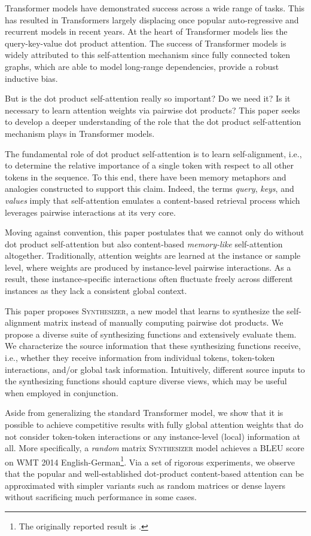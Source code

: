\documentclass{article}
\begin{document}
Transformer models \citep{vaswani2017attention} have demonstrated success across a wide range of tasks. This has resulted in Transformers largely displacing once popular auto-regressive and recurrent models in recent years. At the heart of Transformer models lies the query-key-value dot product attention.  The success of Transformer models is widely attributed to this self-attention mechanism since fully connected token graphs, which are able to model long-range dependencies, provide a robust inductive bias.

But is the dot product self-attention really so important? Do we need it? Is it necessary to learn attention weights  via pairwise dot products? This paper seeks to develop a deeper understanding of the role that the dot product self-attention mechanism plays in Transformer models. 

The fundamental role of dot product self-attention is to learn self-alignment, i.e., to determine the relative importance of a single token with respect to all other tokens in the sequence. To this end, there have been memory metaphors and analogies constructed to support this claim. Indeed, the terms \textit{query}, \textit{keys}, and \textit{values} imply that self-attention emulates a content-based retrieval process which leverages pairwise interactions at its very core. 

Moving against convention, this paper postulates that we cannot only do without dot product self-attention but also content-based \textit{memory-like} self-attention altogether. Traditionally, attention weights are learned at the instance or sample level, where weights are produced by instance-level pairwise interactions. As a result, these instance-specific interactions often fluctuate freely across different instances as they lack a consistent global context.
 
This paper proposes \textsc{Synthesizer}, a new model that learns to synthesize the self-alignment matrix instead of manually computing pairwise dot products. We propose a diverse suite of synthesizing functions and extensively evaluate them. We characterize the source information that these synthesizing functions receive, i.e., whether they receive information from individual tokens, token-token interactions, and/or global task information. Intuitively, different source inputs to the synthesizing functions should capture diverse views, which may be useful when employed in conjunction.
 
Aside from generalizing the standard Transformer model, we show that it is possible to achieve competitive results with fully global attention weights that do not consider token-token interactions or any instance-level (local) information at all. More specifically, a \emph{random} matrix \textsc{Synthesizer} model achieves a  BLEU score on WMT 2014 English-German\footnote{The originally reported result is .}. Via a set of rigorous experiments, we observe that the popular and well-established dot-product content-based attention can be approximated with simpler variants such as random matrices or dense layers without sacrificing much performance in some cases. 
\end{document}
